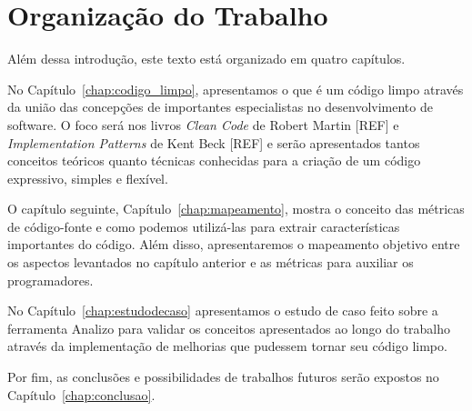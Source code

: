 \section{Organização do Trabalho}
\label{sec:organizacao_trabalho}

Além dessa introdução, este texto está organizado em quatro capítulos.

No Capítulo~\ref{chap:codigo_limpo}, apresentamos o que é um código limpo através
da união das concepções de importantes especialistas no desenvolvimento de software.
O foco será nos livros \textit{Clean Code} de Robert Martin [REF] e \textit{Implementation
Patterns} de Kent Beck [REF] e serão apresentados tantos conceitos teóricos
quanto técnicas conhecidas para a criação de um código expressivo, simples e flexível.

O capítulo seguinte, Capítulo~\ref{chap:mapeamento}, mostra o conceito das métricas de 
código-fonte e como podemos utilizá-las para extrair características importantes do
código. Além disso, apresentaremos o mapeamento objetivo entre os aspectos levantados
no capítulo anterior e as métricas para auxiliar os programadores.

No Capítulo~\ref{chap:estudodecaso} apresentamos o estudo de caso feito sobre a ferramenta Analizo para 
validar os conceitos apresentados ao longo do trabalho através da implementação de melhorias que pudessem 
tornar seu código limpo.

Por fim, as conclusões e possibilidades de trabalhos futuros serão expostos no Capítulo~\ref{chap:conclusao}.